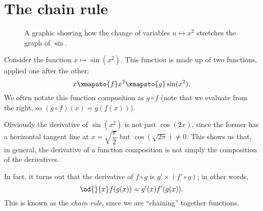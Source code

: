 \section{The chain rule}
\begin{figure}
  \centering
  \caption{A graphic showing how the change of variables $ u \leftrightarrow x^2 $ stretches the graph of $ \sin $.}
\end{figure}

Consider the function $ x \mapsto \sin (x^2) $. This function is made up of two
functions, applied one after the other:
\begin{displaymath}
  x \xmapsto{f} x^2 \xmapsto{g} \sin(x^2).
\end{displaymath}
We often notate this function composition as $ g \circ f $ (note that we
evaluate from the right, so $ (g \circ f)(x) = g(f(x)) $).

Obviously the derivative of $ \sin(x^2) $ is not just $ \cos(2x) $, since the former
has a horizontal tangent line at $ x = \sqrt{\dfrac{\pi}{2}} $ but $ \cos(\sqrt{2\pi}) \neq 0 $. This
shows us that, in general, the derivative of a function composition is not simply the composition
of the derivatives.

In fact, it turns out that the derivative of $ f \circ g $ is $ g' \times (f' \circ g) $; in other words,
\begin{displaymath}
  \od{}{x} f(g(x)) = g'(x) f'(g(x)).
\end{displaymath}
This is known as the \emph{chain rule}, since we are ``chaining'' together functions.

